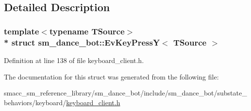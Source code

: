 \subsection{Detailed Description}
\subsubsection*{template$<$typename T\+Source$>$\\*
struct sm\+\_\+dance\+\_\+bot\+::\+Ev\+Key\+Press\+Y$<$ T\+Source $>$}



Definition at line 138 of file keyboard\+\_\+client.\+h.



The documentation for this struct was generated from the following file\+:\begin{DoxyCompactItemize}
\item 
smacc\+\_\+sm\+\_\+reference\+\_\+library/sm\+\_\+dance\+\_\+bot/include/sm\+\_\+dance\+\_\+bot/substate\+\_\+behaviors/keyboard/\hyperlink{keyboard__client_8h}{keyboard\+\_\+client.\+h}\end{DoxyCompactItemize}
